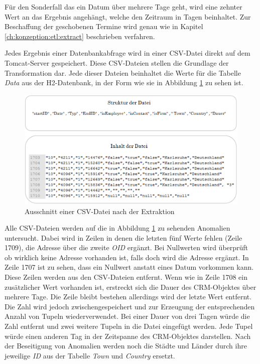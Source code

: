 Für den Sonderfall das ein Datum über mehrere Tage geht, wird eine zehnter Wert an das Ergebnis angehängt, welche den Zeitraum in Tagen beinhaltet. Zur Beschaffung der geschobenen Termine wird genau wie in Kapitel \ref{ch:konzeption:etl:extract} beschrieben verfahren.

Jedes Ergebnis einer Datenbankabfrage wird in einer CSV-Datei direkt auf dem Tomcat-Server gespeichert. Diese CSV-Dateien stellen die Grundlage der Transformation dar. Jede dieser Dateien beinhaltet die Werte für die Tabelle \textit{Data} aus der H2-Datenbank, in der Form wie sie in Abbildung \ref{fig:umsetzung_csv_datei} zu sehen ist. 

\begin{figure}[htbp]
\begin{center}
\includegraphics[width=1.0\textwidth]{pics/umsetzung_csv_datei.png}
\caption{Ausschnitt einer CSV-Datei nach der Extraktion}
\label{fig:umsetzung_csv_datei}
\end{center}
\end{figure}

Alle CSV-Dateien werden auf die in Abbildung \ref{fig:umsetzung_csv_datei} zu sehenden Anomalien untersucht. Dabei wird in Zeilen in denen die letzten fünf Werte fehlen (Zeile 1709), die Adresse über die zweite \textit{OID} ergänzt. Bei Nullwerten wird überprüft ob wirklich keine Adresse vorhanden ist, falls doch wird die Adresse ergänzt. In Zeile 1707 ist zu sehen, dass ein Nullwert anstatt eines Datum vorkommen kann. Diese Zeilen werden aus den CSV-Dateien entfernt. Wenn wie in Zeile 1708 ein zusätzlicher Wert vorhanden ist, erstreckt sich die Dauer des CRM-Objektes über mehrere Tage. Die Zeile bleibt bestehen allerdings wird der letzte Wert entfernt. Die Zahl wird jedoch zwischengespeichert und zur Erzeugung der entsprechenden Anzahl von Tupeln wiederverwendet. Bei einer Dauer von drei Tagen würde die Zahl entfernt und zwei weitere Tupeln in die Datei eingefügt werden. Jede Tupel würde einen anderen Tag in der Zeitspanne des CRM-Objektes darstellen. Nach der Beseitigung von Anomalien werden noch die Städte und Länder durch ihre jeweilige \textit{ID} aus der Tabelle \textit{Town} und \textit{Country} ersetzt.

